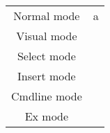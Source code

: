 \documentclass[a4paper,english]{ifimaster}
\begin{document}
\begin{center}
\begin{tabular}{|c|c|}
    Normal mode&a\\
    Visual mode&\\
    Select mode&\\
    Insert mode&\\
    Cmdline mode&\\
    Ex mode&\\
\end{tabular}
\end{center}








\end{document}

